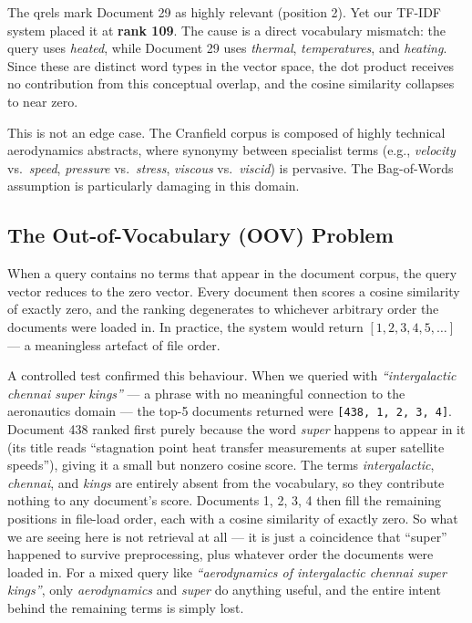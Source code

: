 \documentclass{svproc}
\begin{document}
    The qrels mark Document 29 as highly relevant (position 2). Yet our TF-IDF system placed it at \textbf{rank 109}. The cause is a direct vocabulary mismatch: the query uses \textit{heated}, while Document 29 uses \textit{thermal}, \textit{temperatures}, and \textit{heating}. Since these are distinct word types in the vector space, the dot product receives no contribution from this conceptual overlap, and the cosine similarity collapses to near zero.

    This is not an edge case. The Cranfield corpus is composed of highly technical aerodynamics abstracts, where synonymy between specialist terms (e.g., \textit{velocity} vs.\ \textit{speed}, \textit{pressure} vs.\ \textit{stress}, \textit{viscous} vs.\ \textit{viscid}) is pervasive. The Bag-of-Words assumption is particularly damaging in this domain.

    \subsection{The Out-of-Vocabulary (OOV) Problem}

    When a query contains no terms that appear in the document corpus, the query vector reduces to the zero vector. Every document then scores a cosine similarity of exactly zero, and the ranking degenerates to whichever arbitrary order the documents were loaded in. In practice, the system would return $[1, 2, 3, 4, 5, \ldots]$ — a meaningless artefact of file order.

    A controlled test confirmed this behaviour. When we queried with \textit{``intergalactic chennai super kings''} --- a phrase with no meaningful connection to the aeronautics domain --- the top-5 documents returned were \texttt{[438, 1, 2, 3, 4]}. Document 438 ranked first purely because the word \textit{super} happens to appear in it (its title reads ``stagnation point heat transfer measurements at super satellite speeds''), giving it a small but nonzero cosine score. The terms \textit{intergalactic}, \textit{chennai}, and \textit{kings} are entirely absent from the vocabulary, so they contribute nothing to any document's score. Documents 1, 2, 3, 4 then fill the remaining positions in file-load order, each with a cosine similarity of exactly zero. So what we are seeing here is not retrieval at all --- it is just a coincidence that ``super'' happened to survive preprocessing, plus whatever order the documents were loaded in. For a mixed query like \textit{``aerodynamics of intergalactic chennai super kings''}, only \textit{aerodynamics} and \textit{super} do anything useful, and the entire intent behind the remaining terms is simply lost.
\end{document}
